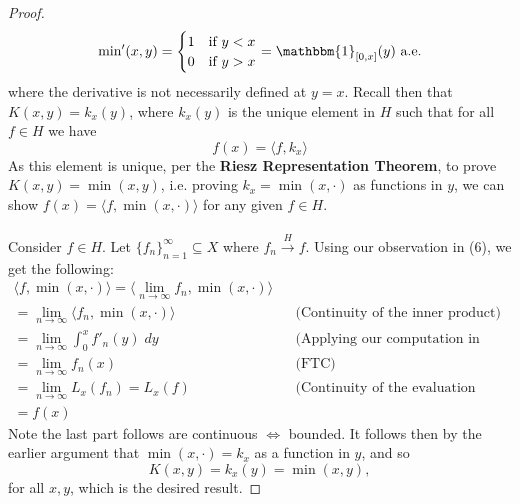 \documentclass[12pt]{article}
\newenvironment{ex}[2][Exercise]{\begin{trivlist}
\item[\hskip \labelsep {\bfseries #1}\hskip \labelsep {\bfseries #2.}]}{\end{trivlist}}
\begin{document}
\begin{ex}{4}
\begin{enumerate}[label=(\alph*)]
\begin{proof}
            \begin{equation}
                \text{min}'(x,y) = \begin{cases}
                    1 & \text{if } y < x \\
                    0 & \text{if } y > x
                \end{cases} = \mathbbm{1}_{[0,x]}(y) \text{ a.e.}
            \end{equation}
            where the derivative is not necessarily defined at $y = x$. Recall then that $K(x,y) = k_x(y)$, where $k_x(y)$ is the unique element in $H$ such that for all $f \in H$ we have
            $$f(x) = \langle f, k_x \rangle$$
            As this element is unique, per the \textbf{Riesz Representation Theorem}, to prove $K(x,y) = \min(x,y)$, i.e. proving $k_x = \min(x, \cdot)$ as functions in $y$, we can show $f(x) = \langle f, \min(x, \cdot)\rangle$ for any given $f \in H$.
            \\ \\ Consider $f \in H$. Let $\{f_n\}_{n = 1}^\infty \subseteq X$ where $f_n \xrightarrow{H} f$. Using our observation in (6), we get the following:
            \begin{align*}
                \langle f, \min(x, \cdot)\rangle = \langle \underset{n \rightarrow \infty}{\lim} f_n, \min(x, \cdot)\rangle \\
                = \underset{n \rightarrow \infty}{\lim} \langle f_n, \min(x, \cdot)\rangle && \text{(Continuity of the inner product)} \\
                = \underset{n \rightarrow \infty}{\lim} \int_0^x f'_n(y) \; dy && \text{(Applying our computation in (6))} \\
                = \underset{n \rightarrow \infty}{\lim} f_n(x) && \text{(FTC)} \\
                = \underset{n \rightarrow \infty}{\lim} L_x(f_n) = L_x(f) && \text{(Continuity of the evaluation functional)} \\
                = f(x)
            \end{align*}
            Note the last part follows are continuous $\Leftrightarrow$ bounded. It follows then by the earlier argument that $\min(x, \cdot) = k_x$ as a function in $y$, and so 
            $$K(x,y) = k_x(y) = \min(x,y),$$
            for all $x, y$, which is the desired result.

        \end{proof}
    \end{enumerate}
\end{ex}
\end{document}

